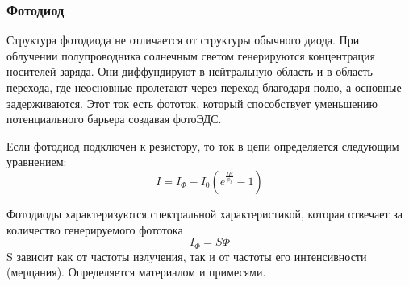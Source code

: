 \subsubsection{Фотодиод}

Структура фотодиода не отличается от структуры обычного диода. При облучении полупроводника солнечным светом генерируются концентрация носителей заряда. Они диффундируют в нейтральную область и в область перехода, где неосновные пролетают через переход благодаря полю, а основные задерживаются. Этот ток есть фототок, который способствует уменьшению потенциального барьера создавая фотоЭДС.

Если фотодиод подключен к резистору, то ток в цепи определяется следующим уравнением:
\begin{equation}
I = I_{\Phi} - I_0 (e^{\frac{IR}{\phi_t}}-1)
\end{equation}

Фотодиоды характеризуются спектральной характеристикой, которая отвечает за количество генерируемого фототока
\begin{equation}
I_{\Phi} = S \Phi
\end{equation}
S зависит как от частоты излучения, так и от частоты его интенсивности (мерцания). Определяется материалом и примесями.